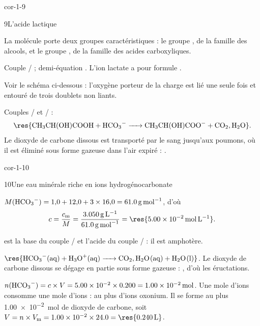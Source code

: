 \begin{blocLivre}{cor-1-9}
\begin{corrige}{9}{L'acide lactique}
\begin{questions}
\item La molécule porte deux groupes caractéristiques : le groupe ,
de la famille des alcools, et le groupe , de la famille des acides carboxyliques.
\item Couple / ; demi-équation
. L'ion lactate a pour formule .
\item Voir le schéma ci-dessous : l'oxygène porteur de la charge est lié une seule fois et entouré de
trois doublets non liants.
\item Couples / et / :
\[\res{\ce{CH3CH(OH)COOH + HCO3- -> CH3CH(OH)COO- + CO2,H2O}}.\]
Le dioxyde de carbone dissous est transporté par le sang jusqu'aux poumons, où il est éliminé
sous forme gazeuse dans l'air expiré : .
\end{questions}
\begin{center}
\par
{}
\end{center}
\end{corrige}
\end{blocLivre}
\begin{blocLivre}{cor-1-10}
\begin{corrige}{10}{Une eau minérale riche en ions hydrogénocarbonate}
\begin{questions}
\item $M(\ce{HCO3-})=1{,}0+12{,}0+3\times16{,}0=\qty{61,0}{g.mol^{-1}}$, d'où
\[c=\frac{c_\mathrm{m}}{M}=\frac{\qty{3,050}{g.L^{-1}}}{\qty{61,0}{g.mol^{-1}}}=\res{\qty{5,00e-2}{mol.L^{-1}}}.\]
\item {} est la base du couple / et l'acide du couple / :
il est amphotère.
\item $\res{\ce{HCO3^-(aq) + H3O^+(aq) -> CO2,H2O(aq) + H2O(l)}}$. Le dioxyde de carbone dissous se dégage
en partie sous forme gazeuse : , d'où les éructations.
\item $n(\ce{HCO3-})=c\times V=\num{5.00e-2}\times\num{0.200}=\qty{1,00e-2}{mol}$. Une mole d'ions
 consomme une mole d'ions  : au plus  d'ions oxonium. Il se
forme au plus \qty{1,00e-2}{mol} de dioxyde de carbone, soit
$V=n\times V_\mathrm{m}=\num{1.00e-2}\times\num{24.0}=\res{\qty{0,240}{L}}$.
\end{questions}
\end{corrige}
\end{blocLivre}
